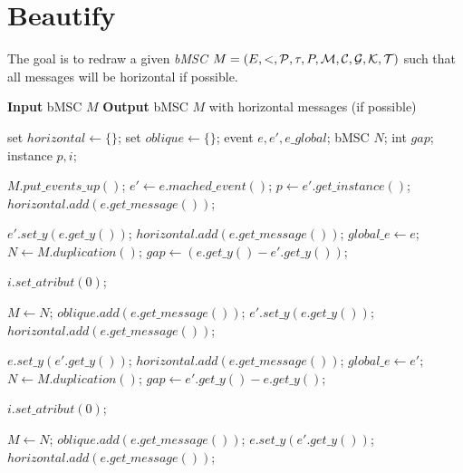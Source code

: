 \documentclass{article}
\newcommand{\type}{{\tau}}
\newcommand{\proc}{{P}}
\newcommand{\procSet}{{\cal P}}
\newcommand{\match}{{\cal M}}
\newcommand{\coregs}{{\cal C}}
\newcommand{\genord}{{\cal G}}
\newcommand{\timerSet}{{\cal T}}
\newcommand{\intConstraintSet}{{\cal K}}
\begin{document}
\section*{Beautify}
The goal is to redraw a given \emph{bMSC} $ M =
(E,<,\procSet,\type,\proc,\match,\coregs,\genord,\intConstraintSet, \timerSet)$
such that all messages will be horizontal if possible.

\begin{algorithmic}[1]

\STATE
\STATE \textbf{Input} bMSC $M$
\STATE \textbf{Output} bMSC $M$ with horizontal messages (if possible)
\STATE 

\STATE set $horizontal \leftarrow \{\}$;
\STATE set $oblique \leftarrow \{\}$;
\STATE event $e, e', e\_global$;
\STATE bMSC $N$;
\STATE int $gap$;
\STATE instance $p, i$;
\STATE

\STATE $M.put\_events\_up()$;
\STATE {}
\STATE $e' \leftarrow e.mached\_event()$;
\STATE $p \leftarrow e'.get\_instance()$; 
\STATE
\STATE {}
\STATE $horizontal.add(e.get\_message())$; 
\ENDIF 
\STATE

\STATE {}
\pagebreak
{}
\STATE $e'.set\_y(e.get\_y())$; 
\STATE $horizontal.add(e.get\_message())$;
\ELSE
\STATE $global\_e \leftarrow e$; 
\STATE $N \leftarrow M.duplication()$;
\STATE $gap \leftarrow (e.get\_y() - e'.get\_y())$;


\STATE $i.set\_atribut(0)$;
\ENDFOR

\STATE $M \leftarrow N$;
\STATE $oblique.add(e.get\_message())$;
\ELSE 
\STATE $e'.set\_y(e.get\_y())$;
\STATE $horizontal.add(e.get\_message())$;
\ENDIF

\ENDIF
\ENDIF
\STATE

\STATE {}
\STATE $e.set\_y(e'.get\_y())$; 
\STATE $horizontal.add(e.get\_message())$;
\ELSE
\STATE $global\_e \leftarrow e'$; 
\STATE $N \leftarrow M.duplication()$;
\STATE $gap \leftarrow e'.get\_y() - e.get\_y()$;


\STATE $i.set\_atribut(0)$;
\ENDFOR

\STATE $M \leftarrow N$;
\STATE $oblique.add(e.get\_message())$;
\ELSE 
\STATE $e.set\_y(e'.get\_y())$;
\STATE $horizontal.add(e.get\_message())$;
\ENDIF

\ENDIF
\ENDIF
\STATE

\ENDFOR
\ENDFOR

\end{algorithmic}
\end{document}
